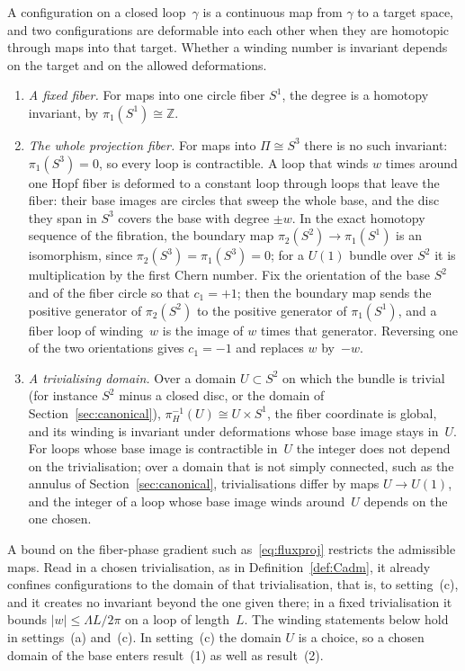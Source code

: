 \documentclass[11pt,a4paper]{article}
\begin{document}
      A configuration on a closed loop~$\gamma$ is a continuous map from
      $\gamma$ to a target space, and two configurations are deformable into
      each other when they are homotopic through maps into that target.
      Whether a winding number is invariant depends on the target and on the
      allowed deformations.
      \begin{enumerate}[label=(\alph*)]
        \item \emph{A fixed fiber.}
          For maps into one circle fiber $S^1$, the degree is a homotopy
          invariant, by $\pi_1(S^1) \cong \mathbb{Z}$.
        \item \emph{The whole projection fiber.}
          For maps into $\Pi \cong S^3$ there is no such invariant:
          $\pi_1(S^3) = 0$, so every loop is contractible.
          A loop that winds $w$ times around one Hopf fiber is deformed to a
          constant loop through loops that leave the fiber: their base images
          are circles that sweep the whole base, and the disc they span in $S^3$
          covers the base with degree $\pm w$.
          In the exact homotopy sequence of the fibration, the boundary map
          $\pi_2(S^2) \to \pi_1(S^1)$ is an isomorphism, since
          $\pi_2(S^3) = \pi_1(S^3) = 0$; for a $U(1)$ bundle over $S^2$ it is
          multiplication by the first Chern number.
          Fix the orientation of the base $S^2$ and of the fiber circle so that
          $c_1 = +1$; then the boundary map sends the positive generator of
          $\pi_2(S^2)$ to the positive generator of $\pi_1(S^1)$, and a fiber loop
          of winding~$w$ is the image of $w$ times that generator.
          Reversing one of the two orientations gives $c_1 = -1$ and replaces $w$
          by~$-w$.
        \item \emph{A trivialising domain.}
          Over a domain $U \subset S^2$ on which the bundle is trivial (for
          instance $S^2$ minus a closed disc, or the domain of
          Section~\ref{sec:canonical}), $\pi_H^{-1}(U) \cong U \times S^1$, the
          fiber coordinate is global, and its winding is invariant under
          deformations whose base image stays in~$U$.
          For loops whose base image is contractible in~$U$ the integer does
          not depend on the trivialisation; over a domain that is not simply
          connected, such as the annulus of Section~\ref{sec:canonical},
          trivialisations differ by maps $U \to U(1)$, and the integer of a loop
          whose base image winds around~$U$ depends on the one chosen.
      \end{enumerate}
      A bound on the fiber-phase gradient such as~\eqref{eq:fluxproj}
      restricts the admissible maps.
      Read in a chosen trivialisation, as in Definition~\ref{def:Cadm}, it
      already confines configurations to the domain of that trivialisation,
      that is, to setting~(c), and it creates no invariant beyond the one given
      there; in a fixed trivialisation it bounds $|w| \le \Lambda L / 2\pi$ on a
      loop of length~$L$.
      The winding statements below hold in settings~(a) and~(c).
      In setting~(c) the domain $U$ is a choice, so a chosen domain of the base
      enters result~(1) as well as result~(2).
\end{document}
